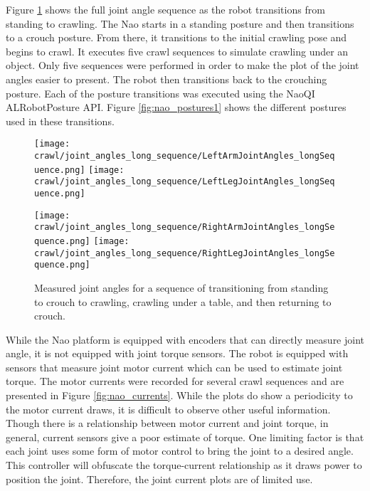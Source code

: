 Figure \ref{fig:nao_joint_angles_long_seq} shows the full joint angle sequence as the robot
transitions from standing to crawling. The Nao starts in a standing posture and then transitions
to a crouch posture. From there, it transitions to the initial crawling pose and begins to
crawl. It executes five crawl sequences to simulate crawling under an object.
Only five sequences were performed in order to make the plot of the joint angles easier to present.
The robot then transitions back to the crouching posture. Each of the posture transitions was
executed using the NaoQI ALRobotPosture API.
Figure \ref{fig:nao_postures1} shows the different postures used in these transitions.

\begin{figure}
  \centerline{
    \texttt{[image: crawl/joint\_angles\_long\_sequence/LeftArmJointAngles\_longSequence.png]}
    \texttt{[image: crawl/joint\_angles\_long\_sequence/LeftLegJointAngles\_longSequence.png]}
  }
  \centerline{
    \texttt{[image: crawl/joint\_angles\_long\_sequence/RightArmJointAngles\_longSequence.png]}
    \texttt{[image: crawl/joint\_angles\_long\_sequence/RightLegJointAngles\_longSequence.png]}
  }
  \caption{Measured joint angles for a sequence of transitioning from standing to crouch to crawling,
           crawling under a table, and then returning to crouch.}
  \label{fig:nao_joint_angles_long_seq}
\end{figure}

While the Nao platform is equipped with encoders that can directly measure joint
angle, it is not equipped with joint torque sensors. The robot is equipped with sensors
that measure joint motor current which can be used to estimate joint torque. The motor currents
were recorded for several crawl sequences and are presented in Figure \ref{fig:nao_currents}.
While the plots do show a periodicity to the motor current draws, it is difficult to observe
other useful information. Though there is a relationship between motor current and joint torque, 
in general, current sensors give a poor estimate of torque. One limiting factor is that each joint uses
some form of motor control to bring the joint to a desired angle. This controller will
obfuscate the torque-current relationship as it draws power to position the joint.
Therefore, the joint current plots are of limited use.

